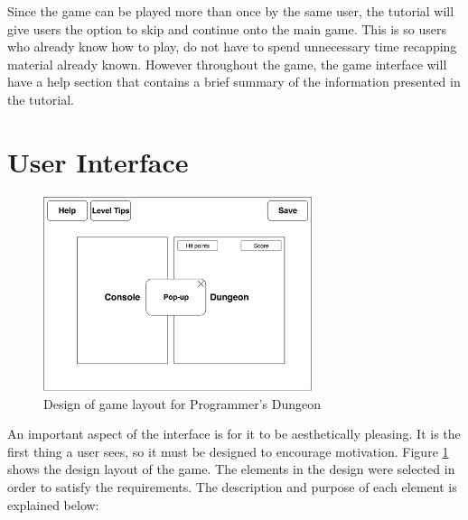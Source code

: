 \documentclass[a4paper,11.5pt]{report}
\numberwithin{figure}{section}
\numberwithin{table}{section}
\numberwithin{equation}{section}
\numberwithin{equation}{section}
\begin{document}
Since the game can be played more than once by the same user, the tutorial will give users the option to skip and continue onto the main game. This is so users who already know how to play, do not have to spend unnecessary time recapping material already known. However throughout the game, the game interface will have a help section that contains a brief summary of the information presented in the tutorial.

\section{User Interface}


\begin{figure}[H]
 \centering
    \includegraphics[width=0.7\textwidth]{User-Interface-Design}
       \captionsetup{justification=centering}
\caption{Design of game layout for Programmer's Dungeon}
\label{fig:User-Interface-Design}
\end{figure}


An important aspect of the interface is for it to be aesthetically pleasing. It is the first thing a user sees, so it must be designed to encourage motivation. Figure \ref{fig:User-Interface-Design} shows the design layout of the game. The elements in the design were selected in order to satisfy the requirements. The description and purpose of each element is explained below:
\end{document}
